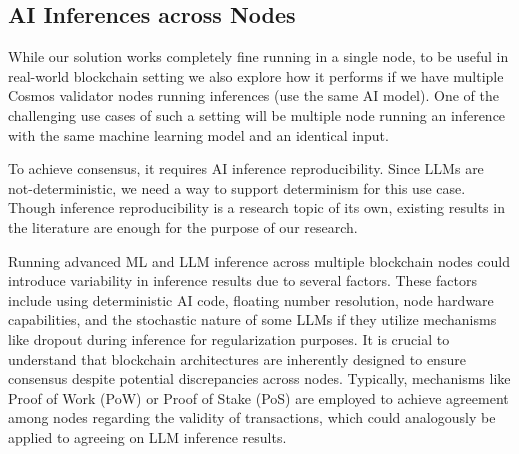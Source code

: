 

\subsection{AI Inferences across Nodes}
While our solution works completely fine running in a single node, to be useful in real-world blockchain setting we also explore how it performs if we have multiple Cosmos validator nodes running inferences (use the same AI model). 
One of the challenging use cases of such a setting will be multiple node running an inference with the same machine learning model and an identical input. 

To achieve consensus, it requires AI inference reproducibility.  Since LLMs are not-deterministic, we need a way to support determinism for this use case. Though inference reproducibility is a research topic of its own, existing results in the literature are enough for the purpose of our research. 

Running advanced ML and LLM inference across multiple blockchain nodes could introduce variability in inference results due to several factors. These factors include using deterministic AI code, floating number resolution, node hardware capabilities, and the stochastic nature of some LLMs if they utilize mechanisms like dropout during inference for regularization purposes. It is crucial to understand that blockchain architectures are inherently designed to ensure consensus despite potential discrepancies across nodes. Typically, mechanisms like Proof of Work (PoW) or Proof of Stake (PoS) are employed to achieve agreement among nodes regarding the validity of transactions, which could analogously be applied to agreeing on LLM inference results. 

